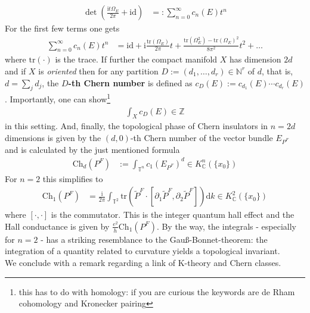 \begin{align*}
  \det
  \left(
    \frac{\mathrm{i}t\Omega_{E}}{2\pi}
    +
    \mathrm{id}
  \right)
  &=:
  \sum_{n=0}^{\infty}
  c_{n}(E)
  t^{n}
\end{align*}
For the first few terms one gets
\begin{align*}
  \sum_{n=0}^{\infty}
  c_{n}(E)
  t^{n}
  &=
  \mathrm{id}
  +
  \mathrm{i}
  \frac{\mathrm{tr}(\Omega_{E})}{2\pi}
  t
  +
  \frac{\mathrm{tr}(\Omega_{E}^{2}) - \mathrm{tr}(\Omega_{E})^{2}}{8\pi^{2}}
  t^{2}
  +
  \ldots
\end{align*}
where $\mathrm{tr}(\cdot)$ is the trace. If further the compact manifold $X$ has dimension $2d$ and if $X$ is \textit{oriented} then for any partition $D := (d_{1},\ldots,d_{r}) \in \mathbb{N}^{r}$ of $d$, that is, $d = \sum_{j}d_{j}$, the \textbf{$D$-th Chern number} is defined as $c_{D}(E) := c_{d_{1}}(E) \cdots c_{d_{r}}(E)$. Importantly, one can show\footnote{this has to do with homology: if you are curious the keywords are de Rham cohomology and Kronecker pairing}
\begin{align*}
  \int_{X}
  c_{D}(E)
  \in
  \mathbb{Z}
\end{align*}
in this setting. And, finally, the topological phase of Chern insulators in $n = 2d$ dimensions is given by the $(d,0)$-th Chern number of the vector bundle $E_{P^{F}}$ and is calculated by the just mentioned formula
\begin{align*}
  \mathrm{Ch}_{d}(P^{F})
  &:=
  \int_{\mathbb{T}^{n}}
  c_{1}(E_{P^{F}})^{d}
  \in
  K_{\mathbb{C}}^{n}(\lbrace x_{0} \rbrace)
\end{align*}
For $n = 2$ this simplifies to
\begin{align*}
  \mathrm{Ch}_{1}(P^{F})
  &=
  \frac{\mathrm{i}}{2\pi}
  \int_{\mathbb{T}^{2}}
  \mathrm{tr}
  \left(
    \tilde{P}^{F}
    \cdot
    [\partial_{1}\tilde{P}^{F},\partial_{2}\tilde{P}^{F}]
  \right)
  \mathrm{d}k
  \in
  K_{\mathbb{C}}^{2}(\lbrace x_{0} \rbrace)
\end{align*}
where $[\cdot,\cdot]$ is the commutator. This is the integer quantum hall effect and the Hall conductance is given by $\frac{e^{2}}{h}\mathrm{Ch}_{1}(P^{F})$. By the way, the integrals - especially for $n = 2$ - has a striking resemblance to the Gau{\ss}-Bonnet-theorem: the integration of a quantity related to curvature yields a topological invariant.
\\
We conclude with a remark regarding a link of K-theory and Chern classes.
\\
